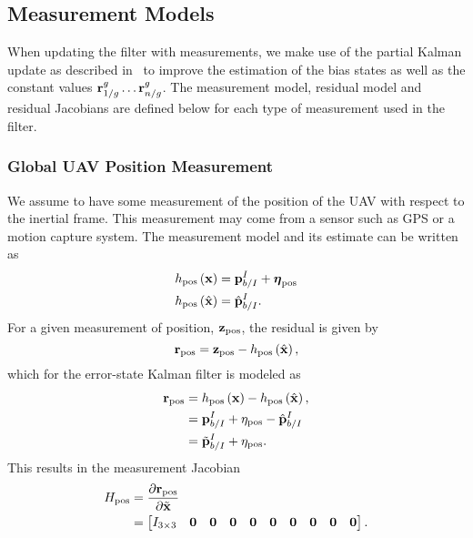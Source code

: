 
\subsection{Measurement Models}
\label{sec:measurement_models}

When
updating the filter with measurements, we make use of the partial Kalman update
as described in~\cite{brink2017partial} to improve the estimation of the
bias states as well as the constant values $\vect{r}_{1/g}^{g} \dots
\vect{r}_{n/g}^{g}$.  The measurement model, residual model and residual
Jacobians are defined below for each type of measurement used in the filter.

\subsubsection{Global UAV Position Measurement}
We assume to have some measurement of the position of the UAV with respect to
the inertial
frame. This measurement may come from a sensor such as GPS or a motion capture system.
The measurement model and its estimate can
be written as
\begin{align}
  h_{\text{pos}} \left( \boldsymbol{\mathrm{x}} \right) &= \boldsymbol{\mathrm{p}}_{b/I}^I +
  \boldsymbol{\mathrm{\eta}}_{\text{pos}} \\
  h_{\text{pos}} \left( \hat{\boldsymbol{\mathrm{x}}} \right) &= \hat{\boldsymbol{\mathrm{p}}}_{b/I}^I.
\end{align}
For a given measurement of position, $\boldsymbol{\mathrm{z}}_{\text{pos}}$, the residual is
given by
\begin{equation}
  \boldsymbol{\mathrm{r}}_{\text{pos}} = \boldsymbol{\mathrm{z}}_{\text{pos}} - h_{\text{pos}} \left( \hat{\boldsymbol{\mathrm{x}}}
  \right),
\end{equation}
which for the error-state Kalman filter is modeled as
\begin{align}
  \boldsymbol{\mathrm{r}}_{\text{pos}} &=  h_{\text{pos}} \left( \boldsymbol{\mathrm{x}} \right) - h_{\text{pos}} \left( \hat{\boldsymbol{\mathrm{x}}}
  \right), \\
                        &= \boldsymbol{\mathrm{p}}_{b/I}^I + \eta_{\text{pos}} -
                        \hat{\boldsymbol{\mathrm{p}}}_{b/I}^I \\
                        &= \tilde{\boldsymbol{\mathrm{p}}}_{b/I}^I + \eta_{\text{pos}}.
\end{align}
This results in the measurement Jacobian
\begin{align}
  H_{\text{pos}} &= \frac{\partial \boldsymbol{\mathrm{r}}_{\text{pos}}}{\partial \tilde{\boldsymbol{\mathrm{x}}}}\\
                 &=
  \begin{bmatrix}
    I_{3 \times 3} & \boldsymbol{\mathrm{0}} & \boldsymbol{\mathrm{0}} & \boldsymbol{\mathrm{0}} & \boldsymbol{\mathrm{0}} & \boldsymbol{\mathrm{0}} &
    \boldsymbol{\mathrm{0}} & \boldsymbol{\mathrm{0}} & \boldsymbol{\mathrm{0}} & \boldsymbol{\mathrm{0}}
  \end{bmatrix}.
\end{align}

